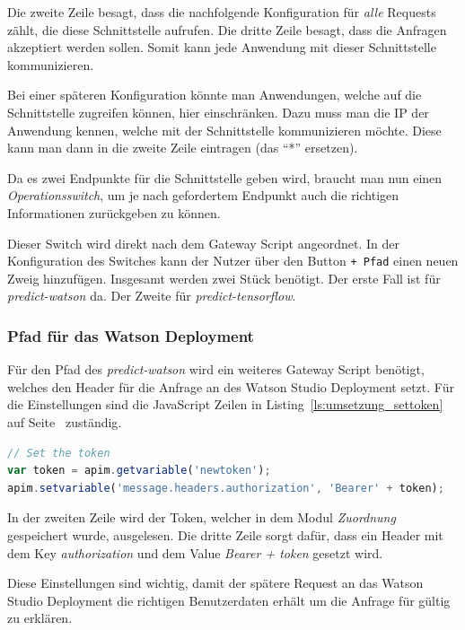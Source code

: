 Die zweite Zeile besagt, dass die nachfolgende Konfiguration für \textit{alle} Requests zählt, die diese Schnittstelle
aufrufen. Die dritte Zeile besagt, dass die Anfragen akzeptiert werden sollen. Somit kann jede Anwendung mit dieser
Schnittstelle kommunizieren.

Bei einer späteren Konfiguration könnte man Anwendungen, welche auf die Schnittstelle zugreifen können, hier
einschränken. Dazu muss man die IP der Anwendung kennen, welche mit der Schnittstelle kommunizieren möchte. Diese kann
man dann in die zweite Zeile eintragen (das \enquote{*} ersetzen).

Da es zwei Endpunkte für die Schnittstelle geben wird, braucht man nun einen \textit{Operationsswitch}, um je nach
gefordertem Endpunkt auch die richtigen Informationen zurückgeben zu können.

Dieser Switch wird direkt nach dem Gateway Script angeordnet. In der Konfiguration des Switches kann der Nutzer über den
Button \texttt{+ Pfad} einen neuen Zweig hinzufügen. Insgesamt werden zwei Stück benötigt. Der erste Fall ist für
\textit{predict-watson} da. Der Zweite für \textit{predict-tensorflow}.

\subsubsection*{Pfad für das Watson Deployment}
Für den Pfad des \textit{predict-watson} wird ein weiteres Gateway Script benötigt, welches den Header für die Anfrage
an des Watson Studio Deployment setzt. Für die Einstellungen sind die JavaScript Zeilen in
Listing~\ref{ls:umsetzung_settoken} auf Seite~\pageref{ls:umsetzung_settoken} zuständig.

\begin{lstlisting}[language=JavaScript, caption=Gateway Script für den Authorization-Token, label=ls:umsetzung_settoken]
// Set the token
var token = apim.getvariable('newtoken');
apim.setvariable('message.headers.authorization', 'Bearer' + token);
\end{lstlisting}

In der zweiten Zeile wird der Token, welcher in dem Modul \textit{Zuordnung} gespeichert wurde, ausgelesen. Die dritte
Zeile sorgt dafür, dass ein Header mit dem Key \textit{authorization} und dem Value \textit{Bearer + token} gesetzt
wird.

Diese Einstellungen sind wichtig, damit der spätere Request an das Watson Studio Deployment die richtigen Benutzerdaten
erhält um die Anfrage für gültig zu erklären.

